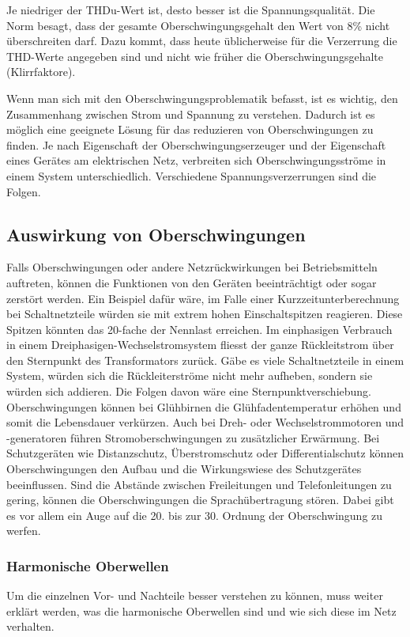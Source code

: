 Je niedriger der THDu-Wert ist, desto besser ist die Spannungsqualität. Die Norm besagt, dass der gesamte Oberschwingungsgehalt den Wert von 8\% nicht überschreiten darf. Dazu kommt, dass heute üblicherweise für die Verzerrung die THD-Werte angegeben sind und nicht wie früher die Oberschwingungsgehalte (Klirrfaktore).

Wenn man sich mit den Oberschwingungsproblematik befasst, ist es wichtig, den Zusammenhang zwischen Strom und Spannung zu verstehen. Dadurch ist es möglich eine geeignete Lösung für das reduzieren von Oberschwingungen zu finden. 
Je nach Eigenschaft der Oberschwingungserzeuger und der Eigenschaft eines Gerätes am elektrischen Netz, verbreiten sich Oberschwingungsströme in einem System unterschiedlich. Verschiedene Spannungsverzerrungen sind die Folgen. 

\subsection{Auswirkung von Oberschwingungen}

Falls Oberschwingungen oder andere Netzrückwirkungen bei Betriebsmitteln auftreten, können die Funktionen von den Geräten beeinträchtigt oder sogar zerstört werden. Ein Beispiel dafür wäre, im Falle einer Kurzzeitunterberechnung bei Schaltnetzteile würden sie mit extrem hohen Einschaltspitzen reagieren. Diese Spitzen könnten das 20-fache der Nennlast erreichen. Im einphasigen Verbrauch in einem Dreiphasigen-Wechselstromsystem fliesst der ganze Rückleitstrom über den Sternpunkt des Transformators zurück. Gäbe es viele Schaltnetzteile in einem System, würden sich die Rückleiterströme nicht mehr aufheben, sondern sie würden sich addieren. Die Folgen davon wäre eine Sternpunktverschiebung. Oberschwingungen können bei Glühbirnen die Glühfadentemperatur erhöhen und somit die Lebensdauer verkürzen. Auch bei Dreh- oder Wechselstrommotoren und -generatoren führen Stromoberschwingungen zu zusätzlicher Erwärmung. Bei Schutzgeräten wie Distanzschutz, Überstromschutz oder Differentialschutz können Oberschwingungen den Aufbau und die Wirkungswiese des Schutzgerätes beeinflussen. Sind die Abstände zwischen Freileitungen und Telefonleitungen zu gering, können die Oberschwingungen die Sprachübertragung stören. Dabei gibt es vor allem ein Auge auf die 20. bis zur 30. Ordnung der Oberschwingung zu werfen.

\subsubsection{Harmonische Oberwellen}
Um die einzelnen Vor- und Nachteile besser verstehen zu können, muss weiter erklärt werden, was die harmonische Oberwellen sind und wie sich diese im Netz verhalten.

